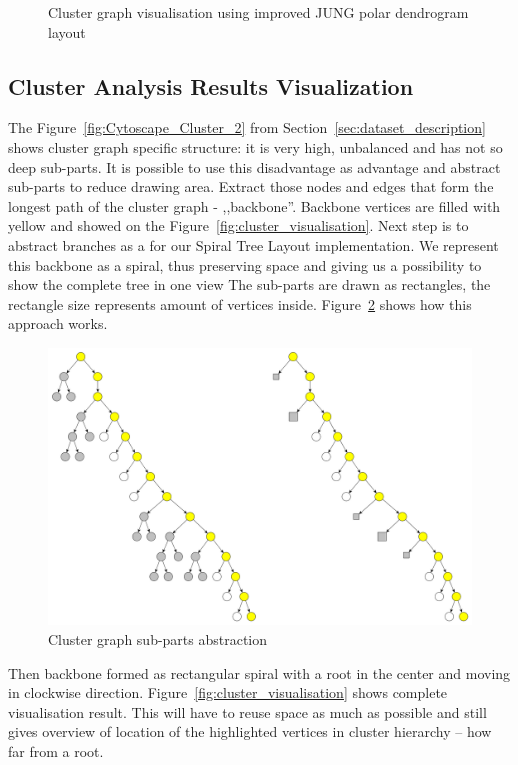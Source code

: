 \begin{figure}[h!]
{    \label{fig:cluster_jogl_impl_with_subgraph_2}
}
\caption{Cluster graph visualisation using improved JUNG polar dendrogram layout}
\end{figure}

\subsection{Cluster Analysis Results Visualization}
\label{sec:cluster}

The Figure~\ref{fig:Cytoscape_Cluster_2} from Section~\ref{sec:dataset_description} shows cluster graph specific structure: it is very high, unbalanced and has not so deep sub-parts. It is possible to use this disadvantage as advantage and abstract sub-parts to reduce drawing area. Extract those nodes and edges that form the longest path of the cluster graph - ,,backbone''. Backbone vertices are filled with yellow and showed on the Figure~\ref{fig:cluster_visualisation}. Next step is to abstract branches as a for our Spiral Tree Layout implementation. We represent this backbone as a spiral, thus preserving space and giving us a possibility to show the complete tree in one view The sub-parts are drawn as rectangles, the rectangle size represents amount of vertices inside. Figure~\ref{fig:cluster_visualisation_algorithm} shows how this approach works.

\begin{figure}[h!]
\centering
\includegraphics[scale=0.25]{pictures/cluster_visualisation_algorithm.png}
\caption{Cluster graph sub-parts abstraction}
\label{fig:cluster_visualisation_algorithm}
\end{figure}

Then backbone formed as rectangular spiral with a root in the center and moving in clockwise direction. Figure~\ref{fig:cluster_visualisation} shows complete visualisation result. This will have to reuse space as much as possible and still gives overview of location of the highlighted vertices in cluster hierarchy -- how far from a root.

